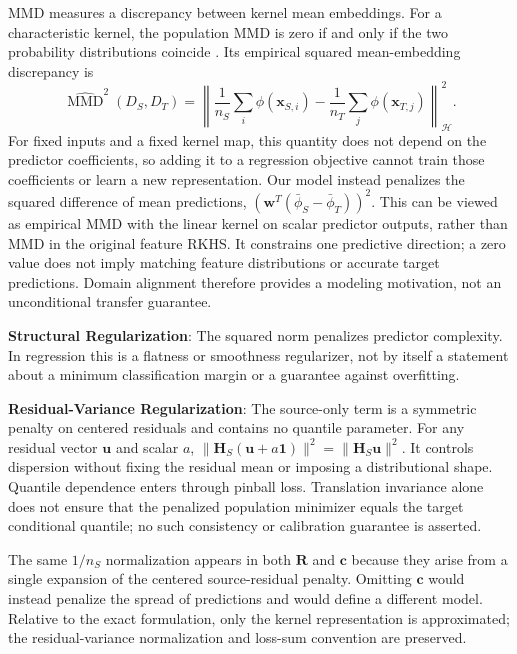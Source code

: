 {\color{blue}MMD measures a discrepancy between kernel mean embeddings. For a characteristic kernel, the population MMD is zero if and only if the two probability distributions coincide \citep{gretton2012kernel}. Its empirical squared mean-embedding discrepancy is}
\begin{equation}
\widehat{\operatorname{MMD}}^2(D_S,D_T)=\left\|\frac{1}{n_S}\sum_i\phi(\boldsymbol{x}_{S,i})-\frac{1}{n_T}\sum_j\phi(\boldsymbol{x}_{T,j})\right\|_{\mathcal H}^2.
\end{equation}
{\color{blue}For fixed inputs and a fixed kernel map, this quantity does not depend on the predictor coefficients, so adding it to a regression objective cannot train those coefficients or learn a new representation. Our model instead penalizes the squared difference of mean predictions, $(\boldsymbol{w}^T(\bar\phi_S-\bar\phi_T))^2$. This can be viewed as empirical MMD with the linear kernel on scalar predictor outputs, rather than MMD in the original feature RKHS. It constrains one predictive direction; a zero value does not imply matching feature distributions or accurate target predictions. Domain alignment therefore provides a modeling motivation, not an unconditional transfer guarantee.}

    \item {\color{blue}\textbf{Structural Regularization}: The squared norm penalizes predictor complexity. In regression this is a flatness or smoothness regularizer, not by itself a statement about a minimum classification margin or a guarantee against overfitting.}

    \item {\color{blue}\textbf{Residual-Variance Regularization}: The source-only term is a symmetric penalty on centered residuals and contains no quantile parameter. For any residual vector $\boldsymbol{u}$ and scalar $a$, $\|\boldsymbol{H}_S(\boldsymbol{u}+a\boldsymbol{1})\|^2=\|\boldsymbol{H}_S\boldsymbol{u}\|^2$. It controls dispersion without fixing the residual mean or imposing a distributional shape. Quantile dependence enters through pinball loss. Translation invariance alone does not ensure that the penalized population minimizer equals the target conditional quantile; no such consistency or calibration guarantee is asserted.}

{\color{blue}The same $1/n_S$ normalization appears in both $\boldsymbol{R}$ and $\boldsymbol{c}$ because they arise from a single expansion of the centered source-residual penalty. Omitting $\boldsymbol{c}$ would instead penalize the spread of predictions and would define a different model. Relative to the exact formulation, only the kernel representation is approximated; the residual-variance normalization and loss-sum convention are preserved.}

